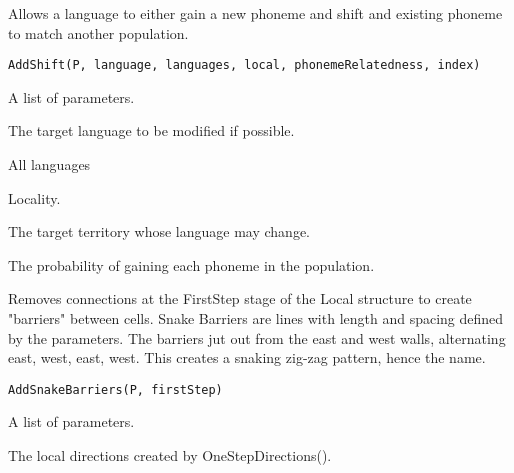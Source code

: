 \documentclass[a4paper]{book}
\begin{document}
%
\begin{Description}\relax
Allows a language to either gain a new phoneme and shift and existing phoneme to match another population.
\end{Description}
%
\begin{Usage}
\begin{verbatim}
AddShift(P, language, languages, local, phonemeRelatedness, index)
\end{verbatim}
\end{Usage}
%
\begin{Arguments}
\begin{ldescription}
\item[\code{P}] A list of parameters.

\item[\code{language}] The target language to be modified if possible.

\item[\code{languages}] All languages

\item[\code{local}] Locality.

\item[\code{index}] The target territory whose language may change.

\item[\code{phonemeProbab}] The probability of gaining each phoneme in the population.
\end{ldescription}
\end{Arguments}
%
\begin{Description}\relax
Removes connections at the FirstStep stage of the Local structure to create "barriers" between cells.  Snake Barriers are lines with length and spacing defined by the parameters.  The barriers jut out from the east and west walls, alternating east, west, east, west.  This creates a snaking zig-zag pattern, hence the name.
\end{Description}
%
\begin{Usage}
\begin{verbatim}
AddSnakeBarriers(P, firstStep)
\end{verbatim}
\end{Usage}
%
\begin{Arguments}
\begin{ldescription}
\item[\code{P}] A list of parameters.

\item[\code{firstStep}] The local directions created by OneStepDirections().
\end{ldescription}
\end{Arguments}
\end{document}
